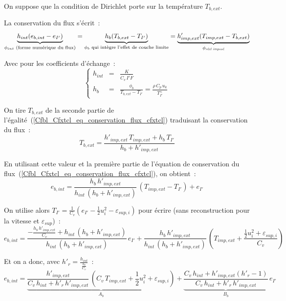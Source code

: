 On suppose que la condition de Dirichlet porte sur la température $T_{b,ext}$.


La conservation du flux s'écrit~:
\begin{equation}\label{Cfbl_Cfxtcl_eq_conservation_flux_cfxtcl}
    \underbrace{h_{int}(e_{b,int}-e_{I'})}_{\phi_{int}\text{\ (forme numérique
du flux)}}
  = \underbrace{h_{b}(T_{b,ext}-T_{I'})}_{\phi_{b}\text{ qui intègre l'effet
de couche limite}}
  =
    \underbrace{h'_{imp,ext}(T_{imp,ext}-T_{b,ext})}_{\phi_{\text{\it réel
imposé}}}
\end{equation}

Avec pour les coefficients d'échange~:
\begin{equation}
\left\{\begin{array}{lll}
h_{int}&=&\displaystyle\frac{K}{C_v\,\overline{I'F}}\\
h_b&=&\displaystyle\frac{\phi_b}{T_{b,ext}-T_{I'}}=\frac{\rho\,C_p\,u_k}{T^+_{I'}}
\end{array}\right.
\end{equation}

On tire $T_{b,ext}$
de la seconde partie de l'égalité~(\ref{Cfbl_Cfxtcl_eq_conservation_flux_cfxtcl})
traduisant la conservation du flux~:
\begin{equation}
\displaystyle T_{b,ext} = \frac{h'_{imp,ext}\,T_{imp,ext}+h_b\,T_{I'}}{h_b+h'_{imp,ext}}
\end{equation}

En utilisant cette valeur et la première partie de l'équation de conservation
du flux~(\ref{Cfbl_Cfxtcl_eq_conservation_flux_cfxtcl}), on obtient~:
\begin{equation}
e_{b,int} = \frac{h_b\,h'_{imp,ext}}{h_{int}\,(h_b+h'_{imp,ext})}\,(T_{imp,ext}-T_{I'})+e_{I'}
\end{equation}

On utilise alors
$\displaystyle T_{I'}=\frac{1}{C_v}\left(e_{I'}-\frac{1}{2}u^2_{i}-\varepsilon_{sup,i}\right)$ pour
écrire (sans reconstruction pour la vitesse et $\varepsilon_{sup}$)~:
\begin{equation}
\displaystyle e_{b,int} =
\frac{ -\frac{h_b\,h'_{imp,ext}}{C_v}+h_{int}\,(h_b+h'_{imp,ext}) }
     { h_{int}\,(h_b+h'_{imp,ext}) } \,e_{I'}
+\frac{h_b\,h'_{imp,ext}}{h_{int}\,(h_b+h'_{imp,ext})}\,
  \left(T_{imp,ext}+\frac{\frac{1}{2}u^2_{i}+\varepsilon_{sup,i}}{C_v}\right)
\end{equation}


Et on a donc, avec $\displaystyle h'_r=\frac{h_{int}}{\frac{h_b}{C_v}}$~:
\begin{equation}
\displaystyle e_{b,int} =
\underbrace{\frac{ h'_{imp,ext} }{ C_v\,h_{int}+h'_r\,h'_{imp,ext} }\,
  \left(C_v\,T_{imp,ext}+\frac{1}{2}u^2_{i}+\varepsilon_{sup,i}\right)}_{A_b}
+\underbrace{\frac{ C_v\,h_{int}+h'_{imp,ext}(h'_r-1) }{ C_v\,h_{int}+h'_r\,h'_{imp,ext} }}_{B_b}\,e_{I'}
\end{equation}

